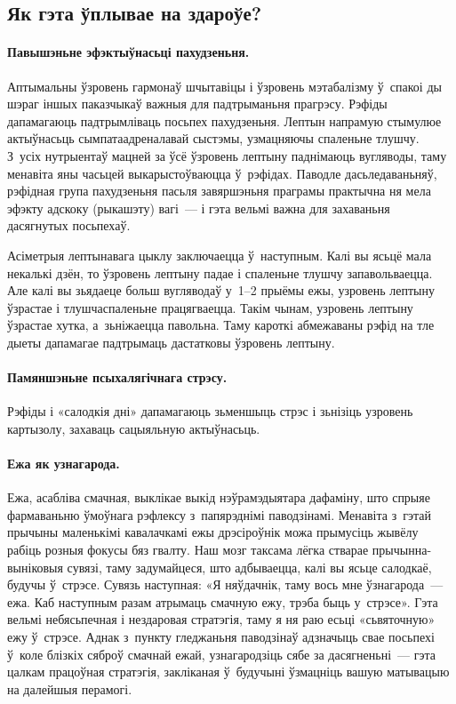 \subsection{Як гэта ўплывае на здароўе?}

\paragraph{Павышэньне эфэктыўнасьці пахудзеньня.}
Аптымальны ўзровень гармонаў шчытавіцы і ўзровень мэтабалізму ў~спакоі ды шэраг іншых паказчыкаў важныя для падтрыманьня прагрэсу. Рэфіды дапамагаюць падтрымліваць посьпех пахудзеньня. Лептын напрамую стымулюе актыўнасьць сымпатаадреналавай сыстэмы, узмацняючы спаленьне тлушчу. З~усіх нутрыентаў мацней за ўсё ўзровень лептыну паднімаюць вугляводы, таму менавіта яны часьцей выкарыстоўваюцца ў~рэфідах. Паводле дасьледаваньняў, рэфідная група пахудзеньня пасьля завяршэньня праграмы практычна ня мела эфэкту адскоку (рыкашэту) вагі~--- і гэта вельмі важна для захаваньня дасягнутых посьпехаў.

Асіметрыя лептынавага цыклу заключаецца ў~наступным. Калі вы ясьцё мала некалькі дзён, то ўзровень лептыну падае і спаленьне тлушчу запавольваецца. Але калі вы зьядаеце больш вугляводаў у~1--2 прыёмы ежы, узровень лептыну ўзрастае і тлушчаспаленьне працягваецца. Такім чынам, узровень лептыну ўзрастае хутка, а~зьніжаецца павольна. Таму кароткі абмежаваны рэфід на тле дыеты дапамагае падтрымаць дастатковы ўзровень лептыну.

\paragraph{Памяншэньне псыхалягічнага стрэсу.}
Рэфіды і «салодкія дні» дапамагаюць зьменшыць стрэс і зьнізіць узровень картызолу, захаваць сацыяльную актыўнасьць.

\paragraph{Ежа як узнагарода.}
Ежа, асабліва смачная, выклікае выкід нэўрамэдыятара дафаміну, што спрыяе фармаваньню ўмоўнага рэфлексу з~папярэднімі паводзінамі. Менавіта з~гэтай прычыны маленькімі кавалачкамі ежы дрэсіроўнік можа прымусіць жывёлу рабіць розныя фокусы бяз гвалту. Наш мозг таксама лёгка стварае прычынна-выніковыя сувязі, таму задумайцеся, што адбываецца, калі вы ясьце салодкаё, будучы ў~стрэсе. Сувязь наступная: «Я няўдачнік, таму вось мне ўзнагарода~--- ежа. Каб наступным разам атрымаць смачную ежу, трэба быць у~стрэсе». Гэта вельмі небясьпечная і нездаровая стратэгія, таму я ня раю есьці «сьвяточную» ежу ў~стрэсе. Аднак з~пункту гледжаньня паводзінаў адзначыць свае посьпехі ў~коле блізкіх сяброў смачнай ежай, узнагародзіць сябе за дасягненьні~--- гэта цалкам працоўная стратэгія, закліканая ў~будучыні ўзмацніць вашую матывацыю на далейшыя перамогі.

